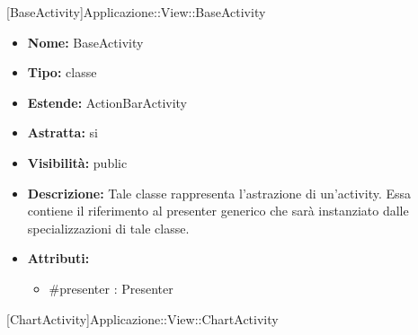 			
			[BaseActivity]{Applicazione::View::BaseActivity}
			

	
			
			\begin{itemize}
			\item \textbf{Nome:} BaseActivity
			\item \textbf{Tipo:} classe
			
		\item \textbf{Estende:}
		ActionBarActivity
		\item \textbf{Astratta:}
		si
			\item \textbf{Visibilità:} public
			\item \textbf{Descrizione:} Tale classe rappresenta l'astrazione di un'activity. Essa contiene il riferimento al presenter generico che sarà instanziato dalle specializzazioni di tale classe.
			\item \textbf{Attributi:}
				\begin{itemize}
				\setlength{\itemsep}{5pt}
				
					\item[\ding{111}] {\#presenter : Presenter}
				\end{itemize}
		
			\end{itemize}

			
			[ChartActivity]{Applicazione::View::ChartActivity}
			

